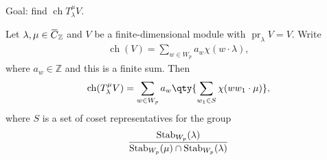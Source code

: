 Goal: find \(\operatorname{ch}T_\lambda^\mu V\).

\begin{theorem}[?]

Let
\(\lambda, \mu \in \mkern 1.5mu\overline{\mkern-1.5muC\mkern-1.5mu}\mkern 1.5mu_{\mathbb{Z}}\)
and \(V\) be a finite-dimensional module with
\({\operatorname{pr}}_\lambda V = V\). Write
\begin{align*}
\operatorname{ch}(V) = \sum_{w\in W_p} a_w \chi(w\cdot \lambda)
,\end{align*}
where \(a_w\in {\mathbb{Z}}\) and this is a finite sum. Then
\begin{align*}  
\operatorname{ch}(T_\lambda^\mu V) = 
\sum_{w\in W_p} a_w \qty{ 
  \sum_{w_1\in S} \chi(ww_1\cdot \mu)
},
\end{align*}
where \(S\) is a set of coset representatives for the group
\begin{align*}
{\operatorname{Stab}}_{W_p}(\lambda) \over {\operatorname{Stab}}_{W_p}(\mu) \cap {\operatorname{Stab}}_{W_p}(\lambda)
\end{align*}

\end{theorem}


